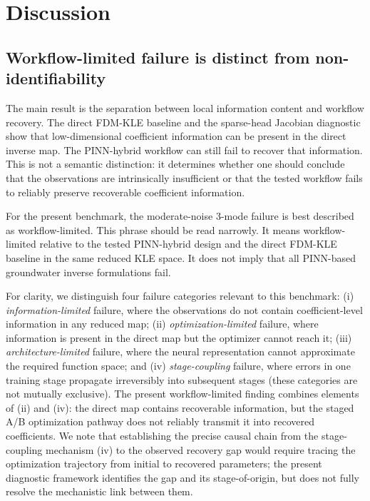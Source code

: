 \documentclass[pdflatex,sn-mathphys,Numbered,iicol]{sn-jnl}
\begin{document}
\section{Discussion}
\label{sec:discussion}

\subsection{Workflow-limited failure is distinct from non-identifiability}
\label{sec:disc-workflow}

The main result is the separation between local information content and
workflow recovery. The direct FDM-KLE baseline and the sparse-head Jacobian
diagnostic show that low-dimensional coefficient information can be present in
the direct inverse map. The PINN-hybrid workflow can still fail to recover
that information. This is not a semantic distinction: it determines whether one
should conclude that the observations are intrinsically insufficient or that
the tested workflow fails to reliably preserve recoverable coefficient information.

For the present benchmark, the moderate-noise 3-mode failure is best described
as workflow-limited. This phrase should be read narrowly. It means
workflow-limited relative to the tested PINN-hybrid design and the direct
FDM-KLE baseline in the same reduced KLE space. It does not imply that all
PINN-based groundwater inverse formulations fail.

For clarity, we distinguish four failure categories relevant to this benchmark:
(i) \emph{information-limited} failure, where the observations do not contain
coefficient-level information in any reduced map; (ii) \emph{optimization-limited}
failure, where information is present in the direct map but the optimizer cannot
reach it; (iii) \emph{architecture-limited} failure, where the neural
representation cannot approximate the required function space; and
(iv) \emph{stage-coupling} failure, where errors in one training stage propagate
irreversibly into subsequent stages (these categories are not mutually
exclusive). The present workflow-limited finding combines
elements of (ii) and (iv): the direct map contains recoverable information, but
the staged A/B optimization pathway does not reliably transmit it into recovered
coefficients. We note that establishing the precise causal chain from the
stage-coupling mechanism (iv) to the observed recovery gap would require tracing
the optimization trajectory from initial to recovered parameters; the present
diagnostic framework identifies the gap and its stage-of-origin, but does not
fully resolve the mechanistic link between them.
\end{document}
